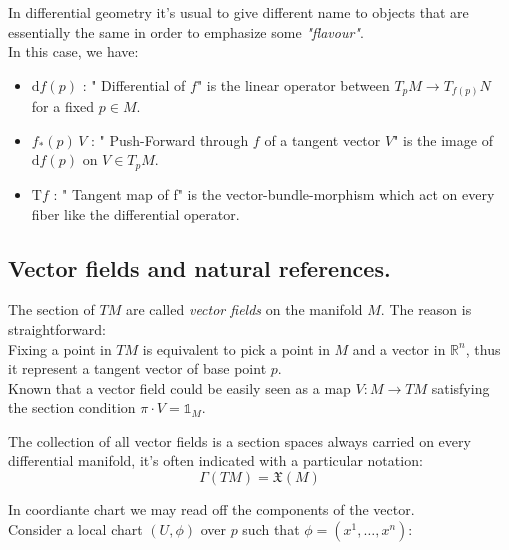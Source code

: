 \documentclass[a4paper,12pt]{scrartcl}    %
\begin{document}
\begin{observation}
In differential geometry it's usual to give different name to objects that are essentially the same in order to emphasize some \emph{"flavour"}.
\\
In this case, we have:
\begin{itemize}
\item $\textrm{d}f(p)$ : " Differential of $f$" is the linear operator between $T_pM \rightarrow T_{f(p)}N$ for a fixed $p\in M$.

\item $f_*(p)\, V$ : " Push-Forward through $f$ of a tangent vector $V$"  is the image of $\textrm{d}f(p)$ on $V\in T_pM$.

\item $\textrm{T}f$ : " Tangent map of f" is the vector-bundle-morphism which act on every fiber like the differential operator.

\end{itemize}

\end{observation}


\subsection{Vector fields and natural references.}

\begin{notationfix}
The section of $TM$ are called \emph{vector fields} on the manifold $M$.
The reason is straightforward:
\\ Fixing a point in $TM$ is equivalent to pick a point in $M$ and a vector in $\mathbb{R}^n$, thus it represent a tangent vector of base point $p$.
\\ Known that a vector field could be easily seen as a map $V:M \rightarrow TM$ satisfying the section condition $ \pi \cdot V = \mathbb{1}_M$.
\end{notationfix}

\begin{notationfix}
The collection of all vector fields is a section spaces always carried on every differential manifold, it's often indicated with a particular notation:
	\begin{displaymath}
	 \Gamma(TM) = \mathfrak{X}(M)
	\end{displaymath}
\end{notationfix}	

In coordiante chart we may read off the components of the vector.
\\Consider a local chart $(U, \phi)$ over $p$ such that $\phi=(x^1, \ldots, x^n )$:
\end{document}
